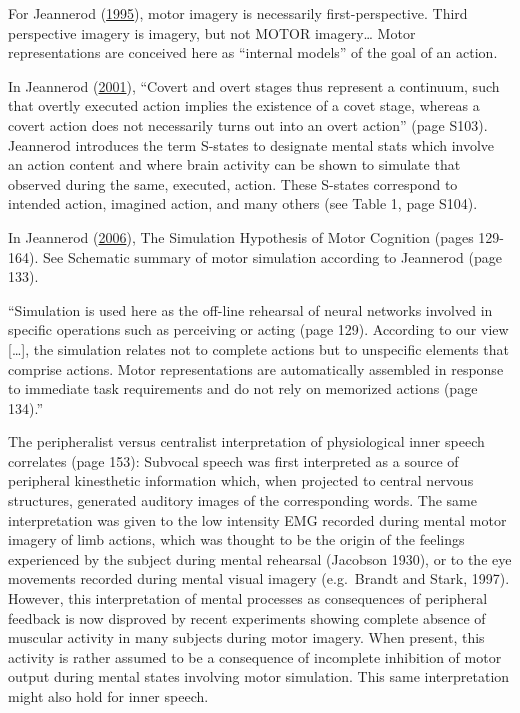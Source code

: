 \documentclass[a4paper,12pt,twoside,openright,oldfontcommands]{memoir}
\begin{document}
For Jeannerod (\protect\hyperlink{ref-jeannerod_mental_1995}{1995}), motor imagery is necessarily first-perspective. Third perspective imagery is imagery, but not MOTOR imagery\ldots{} Motor representations are conceived here as \enquote{internal models} of the goal of an action.

In Jeannerod (\protect\hyperlink{ref-jeannerod_neural_2001}{2001}), \enquote{Covert and overt stages thus represent a continuum, such that overtly executed action implies the existence of a covet stage, whereas a covert action does not necessarily turns out into an overt action} (page S103). Jeannerod introduces the term S-states to designate mental stats which involve an action content and where brain activity can be shown to simulate that observed during the same, executed, action. These S-states correspond to intended action, imagined action, and many others (see Table 1, page S104).

In Jeannerod (\protect\hyperlink{ref-jeannerod_motor_2006}{2006}), The Simulation Hypothesis of Motor Cognition (pages 129-164). See Schematic summary of motor simulation according to Jeannerod (page 133).

\enquote{Simulation is used here as the off-line rehearsal of neural networks involved in specific operations such as perceiving or acting (page 129). According to our view {[}\ldots{]}, the simulation relates not to complete actions but to unspecific elements that comprise actions. Motor representations are automatically assembled in response to immediate task requirements and do not rely on memorized actions (page 134).}

The peripheralist versus centralist interpretation of physiological inner speech correlates (page 153): Subvocal speech was first interpreted as a source of peripheral kinesthetic information which, when projected to central nervous structures, generated auditory images of the corresponding words. The same interpretation was given to the low intensity EMG recorded during mental motor imagery of limb actions, which was thought to be the origin of the feelings experienced by the subject during mental rehearsal (Jacobson 1930), or to the eye movements recorded during mental visual imagery (e.g.~Brandt and Stark, 1997). However, this interpretation of mental processes as consequences of peripheral feedback is now disproved by recent experiments showing complete absence of muscular activity in many subjects during motor imagery. When present, this activity is rather assumed to be a consequence of incomplete inhibition of motor output during mental states involving motor simulation. This same interpretation might also hold for inner speech.
\end{document}
